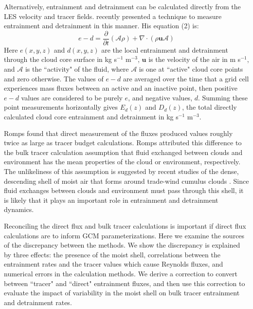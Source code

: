 \documentclass[12pt]{article}
\begin{document}
Alternatively, entrainment and detrainment can be calculated directly from the 
LES velocity and tracer fields.  \cite{Romps2010} recently presented a 
technique to measure entrainment and detrainment in this manner.  His equation (2) is:
\begin{equation}
  \label{eq:romps_e_minus_d}
  e - d = \frac{\partial}{\partial t}(\mathcal{A}\rho) 
        + \nabla \cdot (\rho \mathbf{u} \mathcal{A}) 
\end{equation}
Here $e(x,y,z)$ and $d(x,y,z)$ are the local entrainment and detrainment through 
the cloud core surface in kg s$^{-1}$ m$^{-3}$, $\mathbf{u}$ is the velocity of 
the air in m s$^{-1}$, and $\mathcal{A}$ is the ``activity" of the fluid, where 
$\mathcal{A}$ is one at ``active" cloud core points and zero otherwise.  The 
values of $e - d$ are averaged over the time that a grid cell experiences mass 
fluxes between an active and an inactive point, then positive $e-d$ values 
are considered to be purely $e$, and negative values, $d$.  Summing these point 
measurements horizontally gives $E_d(z)$ and $D_d(z)$, the total directly 
calculated cloud core entrainment and detrainment in kg s$^{-1}$ m$^{-3}$.

Romps found that direct measurement of the fluxes produced values roughly twice 
as large as tracer budget calculations.  Romps attributed this difference to 
the bulk tracer calculation assumption that fluid exchanged between clouds 
and environment has the mean properties of the cloud or environment, 
respectively.  The unlikeliness of this assumption is suggested by recent 
studies of the dense, descending shell of moist air that forms around 
trade-wind cumulus clouds \citep{Heus2008, Wang2010}.  Since fluid exchanges 
between clouds and environment must pass through this shell, it is likely that 
it plays an important role in entrainment and detrainment dynamics.

Reconciling the direct flux and bulk tracer calculations is important if direct 
flux calculations are to inform GCM parameterizations.  Here we examine the 
sources of the discrepancy between the methods.  We show the discrepancy is 
explained by three effects: the presence of the moist shell, correlations 
between the entrainment rates and the tracer values which cause Reynolds 
fluxes, and numerical errors in the calculation methods.  We derive a 
correction to convert between ``tracer" and ``direct" entrainment fluxes, and 
then use this correction to evaluate the impact of variability in the moist 
shell on bulk tracer entrainment and detrainment rates.
\end{document}
